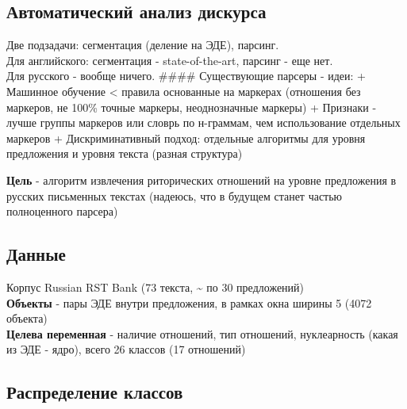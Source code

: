 \documentclass[11pt]{article}
\begin{document}
    \subsection{Автоматический анализ
дискурса}\label{ux430ux432ux442ux43eux43cux430ux442ux438ux447ux435ux441ux43aux438ux439-ux430ux43dux430ux43bux438ux437-ux434ux438ux441ux43aux443ux440ux441ux430}

Две подзадачи: сегментация (деление на ЭДЕ), парсинг.\\
Для английского: сегментация - state-of-the-art, парсинг - еще нет.\\
Для русского - вообще ничего. \#\#\#\# Существующие парсеры - идеи: +
Машинное обучение \textless{} правила основанные на маркерах (отношения
без маркеров, не 100\% точные маркеры, неоднозначные маркеры) + Признаки
- лучше группы маркеров или словрь по н-граммам, чем использование
отдельных маркеров + Дискриминативный подход: отдельные алгоритмы для
уровня предложения и уровня текста (разная структура)

    \textbf{Цель} - алгоритм извлечения риторических отношений на уровне
предложения в русских письменных текстах (надеюсь, что в будущем станет
частью полноценного парсера)

    \subsection{Данные}\label{ux434ux430ux43dux43dux44bux435}

Корпус Russian RST Bank (73 текста, \textasciitilde{} по 30
предложений)\\
\textbf{Объекты} - пары ЭДЕ внутри предложения, в рамках окна ширины 5
(4072 объекта)\\
\textbf{Целева переменная} - наличие отношений, тип отношений,
нуклеарность (какая из ЭДЕ - ядро), всего 26 классов (17 отношений)

    \subsection{Распределение
классов}\label{ux440ux430ux441ux43fux440ux435ux434ux435ux43bux435ux43dux438ux435-ux43aux43bux430ux441ux441ux43eux432}
\end{document}
